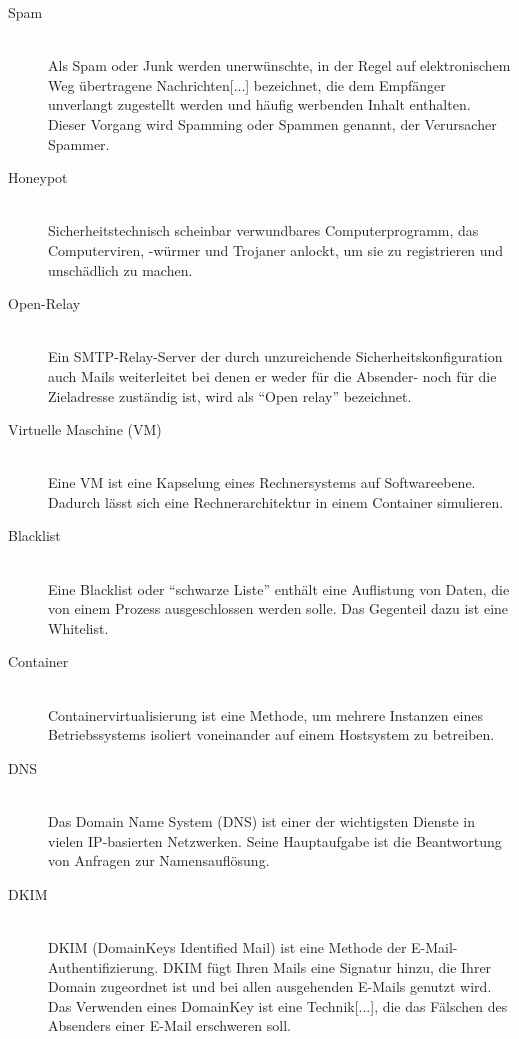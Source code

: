 \documentclass[a4paper,11pt,singlespacing]{article}
\begin{document}
	\begin{description}
	\item[Spam\label{itm:Spam}]\hfill \\
		Als Spam oder Junk werden unerwünschte, in der Regel auf elektronischem Weg übertragene Nachrichten[...] bezeichnet, die dem Empfänger unverlangt zugestellt werden und häufig werbenden Inhalt enthalten. Dieser Vorgang wird Spamming oder Spammen genannt, der Verursacher Spammer.\cite{Spam}
	\item[Honeypot\label{itm:Honeypot}]\hfill \\
		Sicherheitstechnisch scheinbar verwundbares Computerprogramm, das Computerviren, -würmer und Trojaner anlockt, um sie zu registrieren und unschädlich zu machen.\cite{Honeypot}
	\item[Open-Relay\label{itm:OpenRelay}]\hfill \\
		Ein SMTP-Relay-Server der durch unzureichende Sicherheitskonfiguration auch Mails weiterleitet bei denen er weder für die Absender- noch für die Zieladresse zuständig ist, wird als "`Open relay"' bezeichnet.\cite{SMTP-Relay-Server}
	\item[Virtuelle Maschine (VM)\label{itm:VirtuelleMaschine}]\hfill \\
		Eine VM ist eine Kapselung eines Rechnersystems auf Softwareebene. Dadurch lässt sich eine Rechnerarchitektur in einem Container simulieren. \cite{VM}
	\item[Blacklist \label{itm:Blacklist}]\hfill \\
		Eine Blacklist oder "`schwarze Liste"' enthält eine Auflistung von Daten, die von einem Prozess ausgeschlossen werden solle. Das Gegenteil dazu ist eine Whitelist. \cite{Blacklist}
	\item[Container\label{itm:Container}]\hfill \\
		Containervirtualisierung ist eine Methode, um mehrere Instanzen eines Betriebssystems isoliert voneinander auf einem Hostsystem zu betreiben.\cite{Container}
	\item[DNS\label{itm:DNS}]\hfill \\
		Das Domain Name System (DNS) ist einer der wichtigsten Dienste in vielen IP-basierten Netzwerken. Seine Hauptaufgabe ist die Beantwortung von Anfragen zur Namensauflösung.\cite{DNS}
	\item[DKIM\label{itm:DKIM}]\hfill \\
		DKIM (DomainKeys Identified Mail) ist eine Methode der E-Mail-Authentifizierung. DKIM fügt Ihren Mails eine Signatur hinzu, die Ihrer Domain zugeordnet ist und bei allen ausgehenden E-Mails genutzt wird. Das Verwenden eines DomainKey ist eine Technik[...], die das Fälschen des Absenders einer E-Mail erschweren soll.\cite{DKIM}

\end{description}
\end{document}
